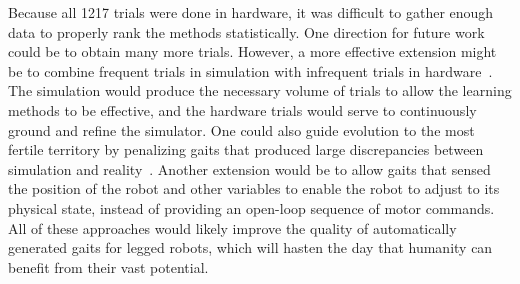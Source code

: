 
Because all 1217 trials were done in hardware, it was difficult to gather
enough data to properly rank the methods statistically.
One direction for future work could be to obtain many more trials. However, a more effective extension might be to combine frequent trials in
simulation with infrequent trials in hardware~\citep{bongard}.  The simulation would produce the
necessary volume of trials to allow the learning methods to be
effective, and the hardware trials would serve to continuously ground
and refine the simulator.  One could also guide evolution to the most
fertile territory by penalizing gaits that produced large
discrepancies between simulation and reality~\citep{koos2010crossing}. Another extension would be to allow gaits that sensed the position of the robot and other variables to enable the robot to adjust to its physical state, instead of providing an open-loop sequence of motor commands. All of these approaches would likely improve the quality of automatically generated gaits for legged robots, which will hasten the day that humanity can benefit from their vast potential. 

